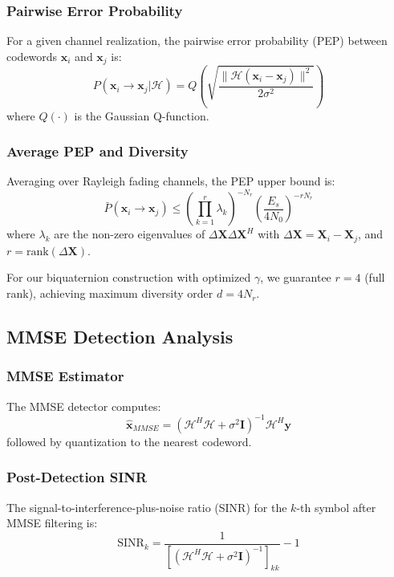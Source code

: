 \subsubsection{Pairwise Error Probability}
For a given channel realization, the pairwise error probability (PEP) between codewords $\mathbf{x}_i$ and $\mathbf{x}_j$ is:
\begin{equation}
P(\mathbf{x}_i \to \mathbf{x}_j | \mathcal{H}) = Q\left(\sqrt{\frac{\|\mathcal{H}(\mathbf{x}_i - \mathbf{x}_j)\|^2}{2\sigma^2}}\right)
\end{equation}
where $Q(\cdot)$ is the Gaussian Q-function.

\subsubsection{Average PEP and Diversity}
Averaging over Rayleigh fading channels, the PEP upper bound is:
\begin{equation}
\bar{P}(\mathbf{x}_i \to \mathbf{x}_j) \leq \left(\prod_{k=1}^{r} \lambda_k\right)^{-N_r} \left(\frac{E_s}{4N_0}\right)^{-rN_r}
\end{equation}
where $\lambda_k$ are the non-zero eigenvalues of $\Delta\mathbf{X}\Delta\mathbf{X}^H$ with $\Delta\mathbf{X} = \mathbf{X}_i - \mathbf{X}_j$, and $r = \text{rank}(\Delta\mathbf{X})$.

For our biquaternion construction with optimized $\gamma$, we guarantee $r = 4$ (full rank), achieving maximum diversity order $d = 4N_r$.

\subsection{MMSE Detection Analysis}

\subsubsection{MMSE Estimator}
The MMSE detector computes:
\begin{equation}
\hat{\mathbf{x}}_{MMSE} = (\mathcal{H}^H\mathcal{H} + \sigma^2\mathbf{I})^{-1}\mathcal{H}^H\mathbf{y}
\end{equation}
followed by quantization to the nearest codeword.

\subsubsection{Post-Detection SINR}
The signal-to-interference-plus-noise ratio (SINR) for the $k$-th symbol after MMSE filtering is:
\begin{equation}
\text{SINR}_k = \frac{1}{\left[(\mathcal{H}^H\mathcal{H} + \sigma^2\mathbf{I})^{-1}\right]_{kk}} - 1
\end{equation}

